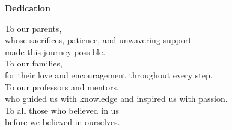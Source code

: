 \thispagestyle{empty}
\begin{center}
  {\Large\bfseries Dedication}
\end{center}
\vspace*{\fill}
\begin{center}
  \itshape

  To our parents,\\
  whose sacrifices, patience, and unwavering support\\
  made this journey possible.\\[1em]

  To our families,\\
  for their love and encouragement throughout every step.\\[1em]

  To our professors and mentors,\\
  who guided us with knowledge and inspired us with passion.\\[1em]

  To all those who believed in us\\
  before we believed in ourselves.

\end{center}
\vspace*{\fill}
